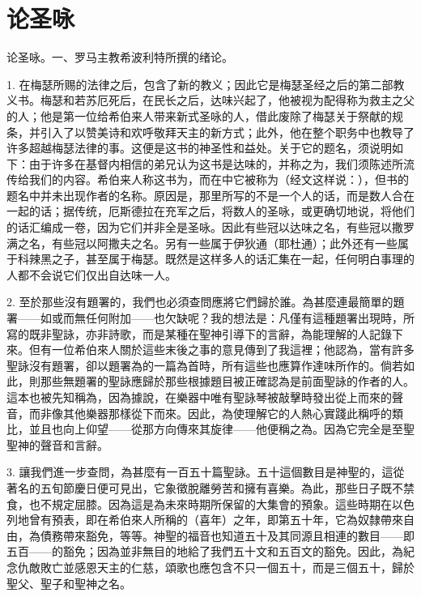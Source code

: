 
\section{论圣咏}

论圣咏。一、罗马主教希波利特所撰的绪论。\par

1. 在梅瑟所赐的法律之后，包含了新的教义；因此它是梅瑟圣经之后的第二部教义书。梅瑟和若苏厄死后，在民长之后，达味兴起了，他被视为配得称为救主之父的人；他是第一位给希伯来人带来新式圣咏的人，借此废除了梅瑟关于祭献的规条，并引入了以赞美诗和欢呼敬拜天主的新方式；此外，他在整个职务中也教导了许多超越梅瑟法律的事。这便是这书的神圣性和益处。关于它的题名，须说明如下：由于许多在基督内相信的弟兄认为这书是达味的，并称之为，我们须陈述所流传给我们的内容。希伯来人称这书为，而在中它被称为（经文这样说：），但书的题名中并未出现作者的名称。原因是，那里所写的不是一个人的话，而是数人合在一起的话；据传统，厄斯德拉在充军之后，将数人的圣咏，或更确切地说，将他们的话汇编成一卷，因为它们并非全是圣咏。因此有些冠以达味之名，有些冠以撒罗满之名，有些冠以阿撒夫之名。另有一些属于伊狄通（耶杜通）；此外还有一些属于科辣黑之子，甚至属于梅瑟。既然是这样多人的话汇集在一起，任何明白事理的人都不会说它们仅出自达味一人。\par

2. 至於那些沒有題署的，我們也必須查問應將它們歸於誰。為甚麼連最簡單的題署——如或而無任何附加——也欠缺呢？我的想法是：凡僅有這種題署出現時，所寫的既非聖詠，亦非詩歌，而是某種在聖神引導下的言辭，為能理解的人記錄下來。但有一位希伯來人關於這些末後之事的意見傳到了我這裡；他認為，當有許多聖詠沒有題署，卻以題署為的一篇為首時，所有這些也應算作達味所作的。倘若如此，則那些無題署的聖詠應歸於那些根據題目被正確認為是前面聖詠的作者的人。這本也被先知稱為，因為據說，在樂器中唯有聖詠琴被敲擊時發出從上而來的聲音，而非像其他樂器那樣從下而來。因此，為使理解它的人熱心實踐此稱呼的類比，並且也向上仰望——從那方向傳來其旋律——他便稱之為。因為它完全是至聖聖神的聲音和言辭。\par

3. 讓我們進一步查問，為甚麼有一百五十篇聖詠。五十這個數目是神聖的，這從著名的五旬節慶日便可見出，它象徵脫離勞苦和擁有喜樂。為此，那些日子既不禁食，也不規定屈膝。因為這是為未來時期所保留的大集會的預象。這些時期在以色列地曾有預表，即在希伯來人所稱的（喜年）之年，即第五十年，它為奴隸帶來自由，為債務帶來豁免，等等。神聖的福音也知道五十及其同源且相連的數目——即五百——的豁免；因為並非無目的地給了我們五十文和五百文的豁免。因此，為紀念仇敵敗亡並感恩天主的仁慈，頌歌也應包含不只一個五十，而是三個五十，歸於聖父、聖子和聖神之名。\par

